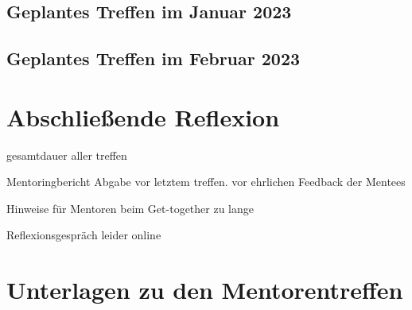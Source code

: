 \documentclass[
    paper=A4,
    div=calc,
    numbers=noendperiod
]{scrartcl}
\begin{document}
\subsection{Geplantes Treffen im Januar 2023}

\subsection{Geplantes Treffen im Februar 2023}

\section{Abschließende Reflexion}

    gesamtdauer aller treffen

    Mentoringbericht Abgabe vor letztem treffen. vor ehrlichen Feedback der Mentees

    Hinweise für Mentoren beim Get-together zu lange

    Reflexionsgespräch leider online



\appendix

\section{Unterlagen zu den Mentorentreffen}
    \label{sec:app}
    
    
    \label{app:meeting3}

    
    \label{app:meeting4}
\end{document}
